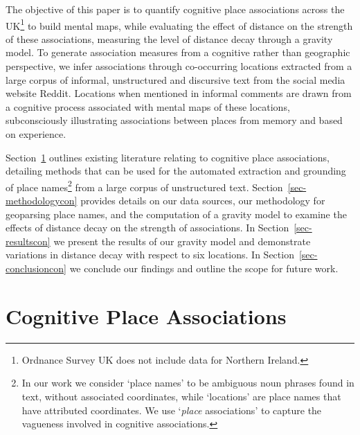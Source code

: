 \documentclass[
  letterpaper,
  11pt,
  english,
  onehalfspacing,
  headsepline]{MastersDoctoralThesis}
\begin{document}
The objective of this paper is to quantify cognitive place associations
across the UK\footnote{Ordnance Survey UK does not include data for
  Northern Ireland.} to build mental maps, while evaluating the effect
of distance on the strength of these associations, measuring the level
of distance decay through a gravity model. To generate association
measures from a cognitive rather than geographic perspective, we infer
associations through co-occurring locations extracted from a large
corpus of informal, unstructured and discursive text from the social
media website Reddit. Locations when mentioned in informal comments are
drawn from a cognitive process associated with mental maps of these
locations, subconsciously illustrating associations between places from
memory and based on experience.

Section~\ref{sec-cognitive-place-associations} outlines existing
literature relating to cognitive place associations, detailing methods
that can be used for the automated extraction and grounding of place
names\footnote{In our work we consider `place names' to be ambiguous
  noun phrases found in text, without associated coordinates, while
  `locations' are place names that have attributed coordinates. We use
  `\emph{place} associations' to capture the vagueness involved in
  cognitive associations.} from a large corpus of unstructured text.
Section~\ref{sec-methodologycon} provides details on our data sources,
our methodology for geoparsing place names, and the computation of a
gravity model to examine the effects of distance decay on the strength
of associations. In Section~\ref{sec-resultscon} we present the results
of our gravity model and demonstrate variations in distance decay with
respect to six locations. In Section~\ref{sec-conclusioncon} we conclude
our findings and outline the scope for future work.

\hypertarget{sec-cognitive-place-associations}{%
\section{Cognitive Place
Associations}\label{sec-cognitive-place-associations}}
\end{document}
